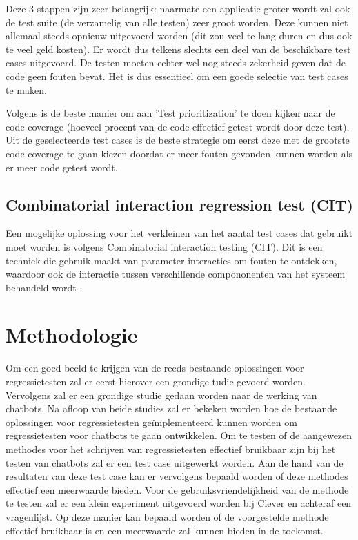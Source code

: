 Deze 3 stappen zijn zeer belangrijk: naarmate een applicatie groter wordt zal ook de test suite (de verzamelig van alle testen) zeer groot worden. Deze kunnen niet allemaal steeds opnieuw uitgevoerd worden (dit zou veel te lang duren en dus ook te veel geld kosten). Er wordt dus telkens slechts een deel van de beschikbare test cases uitgevoerd. De testen moeten echter wel nog steeds zekerheid geven dat de code geen fouten bevat. Het is dus essentieel om een goede selectie van test cases te maken. 

Volgens \textcite{PrashantMalangave2015} is de beste manier om aan 'Test prioritization' te doen kijken naar de code coverage (hoeveel procent van de code effectief getest wordt door deze test). Uit de geselecteerde test cases is de beste strategie om eerst deze met de grootste code coverage te gaan kiezen doordat er meer fouten gevonden kunnen worden als er meer code getest wordt.

\subsection{Combinatorial interaction regression test (CIT)}

Een mogelijke oplossing voor het verkleinen van het aantal test cases dat gebruikt moet worden is volgens \textcite{Qu2014} Combinatorial interaction testing (CIT). Dit is een techniek die gebruik maakt van parameter interacties om fouten te ontdekken, waardoor ook de interactie tussen verschillende compononenten van het systeem behandeld wordt \autocite{Brcic2013}.


\section{Methodologie}
\label{sec:methodologie}

Om een goed beeld te krijgen van de reeds bestaande oplossingen voor regressietesten zal er eerst hierover een grondige tudie gevoerd worden. Vervolgens zal er een grondige studie gedaan worden naar de werking van chatbots. Na afloop van beide studies zal er bekeken worden hoe de bestaande oplossingen voor regressietesten geïmplementeerd kunnen worden om regressietesten voor chatbots te gaan ontwikkelen. Om te testen of de aangewezen methodes voor het schrijven van regressietesten effectief bruikbaar zijn bij het testen van chatbots zal er een test case uitgewerkt worden. Aan de hand van de resultaten van deze test case kan er vervolgens bepaald worden of deze methodes effectief een meerwaarde bieden. Voor de gebruiksvriendelijkheid van de methode te testen zal er een klein experiment uitgevoerd worden bij Clever en achteraf een vragenlijst. Op deze manier kan bepaald worden of de voorgestelde methode effectief bruikbaar is en een meerwaarde zal kunnen bieden in de toekomst. 



